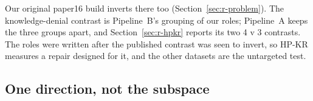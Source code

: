 Our original paper16 build inverts there too (Section~\ref{sec:r-problem}). %
The knowledge-denial contrast is Pipeline~B's grouping of our roles; Pipeline~A keeps the three groups apart, and Section~\ref{sec:r-hpkr} reports its two 4 v 3 contrasts. %
The roles were written after the published contrast was seen to invert, so HP-KR measures a repair designed for it, and the other datasets are the untargeted test. %

\subsection{One direction, not the subspace}
\label{sec:r-adj-direction}

